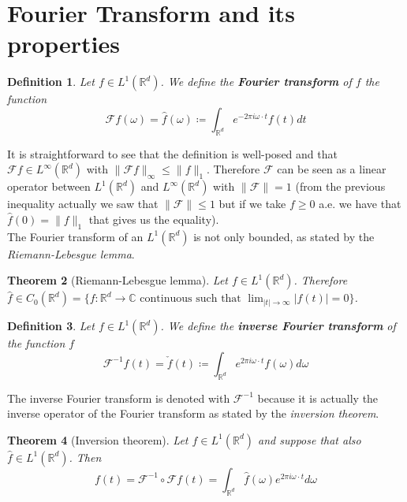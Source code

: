 \documentclass[corpo=11pt, stile=classica, tipotesi=custom,
greek, evenboxes, english]{toptesi}
\numberwithin{equation}{chapter}
\newtheorem{teo}{Theorem}[chapter] %
\newtheorem{defi}[teo]{Definition}
\theoremstyle{remark}
\newcommand{\R}{\mathbb{R}} %
\newcommand{\F}{\mathscr{F}} %
\newcommand{\C}{\mathbb{C}} %
\begin{document}
\section{Fourier Transform and its properties}\label{Fourier transform and its properties section}
\begin{defi}\label{Fourier transform def}
	Let $f \in L^1(\R^d)$. We define the \textbf{Fourier transform} of $f$ the function
	\begin{equation}\label{Fourier transform formula}
		\F f(\omega) = \hat{f}(\omega) \coloneqq \int_{\R^d} e^{-2 \pi i \omega \cdot t} f(t) dt
	\end{equation}
\end{defi}
It is straightforward to see that the definition is well-posed and that $\F f \in L^{\infty}(\R^d)$ with $\|\F f\|_{\infty} \leq \| f \|_1$. Therefore $\F$ can be seen as a linear operator between $L^1(\R^d)$ and $L^{\infty}(\R^d)$ with $\| \F \| = 1$ (from the previous inequality actually we saw that $\| \F \| \leq 1$ but if we take $f \geq 0$ a.e. we have that $\hat{f}(0) = \| f \|_1$ that gives us the equality).\\
The Fourier transform of an $L^1(\R^d)$ is not only bounded, as stated by the \emph{Riemann-Lebesgue lemma}.
\begin{teo}[Riemann-Lebesgue lemma]\label{Riemann-Lebesgue lemma}
	Let $f \in L^1(\R^d)$. Therefore $\hat{f} \in C_0(\R^d) = \{f : \R^d \rightarrow \C \text{ continuous such that } \lim_{|t| \rightarrow \infty} |f(t)|=0\}$.
\end{teo}
\begin{defi}\label{inverse Fourier transform def}
	Let $f \in L^1(\R^d)$. We define the \textbf{inverse Fourier transform} of the function $f$
	\begin{equation}\label{inverse Fourier transform formula}
		\F^{-1} f(t) = \check{f}(t) \coloneqq \int_{\R^d} e^{2 \pi i \omega \cdot t} f(\omega) d\omega
	\end{equation}
\end{defi}
The inverse Fourier transform is denoted with $\F^{-1}$ because it is actually the inverse operator of the Fourier transform as stated by the \emph{inversion theorem}.
\begin{teo}[Inversion theorem]\label{inversion theorem}
	Let $f \in L^1(\R^d)$ and suppose that also $\hat{f} \in L^1(\R^d)$. Then
	\begin{equation*}
		f(t) = \F^{-1} \circ \F f(t) = \int_{\R^d} \hat{f}(\omega) e^{2 \pi i \omega \cdot t}d\omega
	\end{equation*}
\end{teo}
\end{document}
